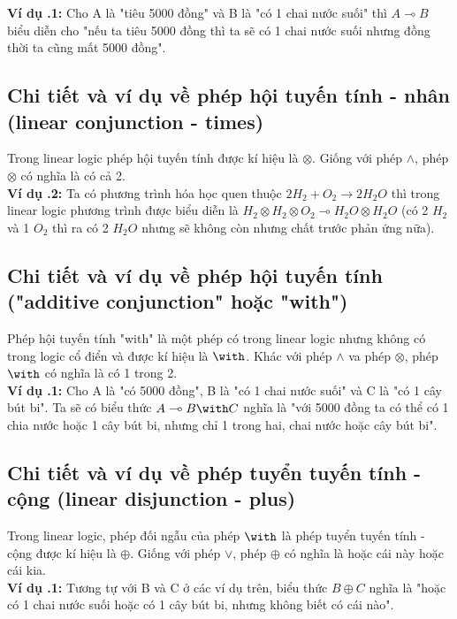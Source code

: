 \documentclass[a4paper]{article}
\begin{document}
\textbf{Ví dụ \thesubsection.1:} Cho A là "tiêu 5000 đồng" và B là "có 1 chai nước suối" thì $A \multimap B$ biểu diễn cho "nếu ta tiêu 5000 đồng thì ta sẽ có 1 chai nước suối nhưng đồng thời ta cũng mất 5000 đồng".

\subsection{Chi tiết và ví dụ về phép hội tuyến tính - nhân (linear conjunction - times)}
Trong linear logic phép hội tuyến tính được kí hiệu là $\otimes$. Giống với phép $\land$, phép $\otimes$ có nghĩa là có cả 2.\\

\textbf{Ví dụ \thesubsection.2:} Ta có phương trình hóa học quen thuộc $2H_2 + O_2 \rightarrow 2H_2O$ thì trong linear logic phương trình được biểu diễn là $H_2 \otimes H_2 \otimes O_2 \multimap H_2O \otimes H_2O$ (có 2 $H_2$ và 1 $O_2$ thì ra có 2 $H_2O$ nhưng sẽ không còn nhưng chất trước phản ứng nữa).

\subsection{Chi tiết và ví dụ về phép hội tuyến tính ("additive conjunction" hoặc "with")}
Phép hội tuyến tính "with" là một phép có trong linear logic nhưng không có trong logic cổ điển và được kí hiệu là $\with$. Khác với phép $\land$ va phép $\otimes$, phép $\with$ có nghĩa là có 1 trong 2.\\

\textbf{Ví dụ \thesubsection.1:} Cho A là "có 5000 đồng", B là "có 1 chai nước suối" và C là "có 1 cây bút bi". Ta sẽ có biểu thức $A \multimap B \with C$ nghĩa là "với 5000 đồng ta có thể có 1 chia nước hoặc 1 cây bút bi, nhưng chỉ 1 trong hai, chai nước hoặc cây bút bi".

\subsection{Chi tiết và ví dụ về phép tuyển tuyến tính - cộng (linear disjunction - plus)}
Trong linear logic, phép đối ngẫu của phép $\with$ là phép tuyển tuyến tính - cộng được kí hiệu là $\oplus$. Giống với phép $\lor$, phép $\oplus$ có nghĩa là hoặc cái này hoặc cái kia.\\

\textbf{Ví dụ \thesubsection.1:} Tương tự với B và C ở các ví dụ trên, biểu thức $B \oplus C$ nghĩa là "hoặc có 1 chai nước suối hoặc có 1 cây bút bi, nhưng không biết có cái nào".
\end{document}
